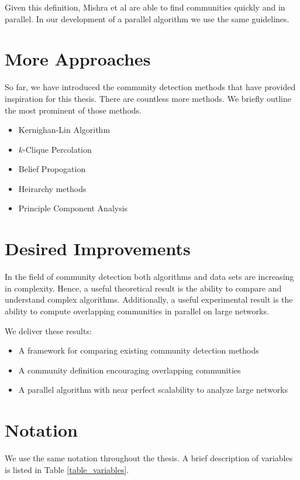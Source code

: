 \documentclass[phd,tocprelim]{cornell}
\begin{document}
Given this definition, Mishra et al\cite{mishra} are able to find communities quickly and in parallel.  In our development of a parallel algorithm we use the same guidelines.

\section {More Approaches}

So far, we have introduced the community detection methods that have provided inspiration for this thesis.  There are countless more methods.  We briefly outline the most prominent of those methods.

\begin{itemize}
\item Kernighan-Lin Algorithm
\item $k$-Clique Percolation
\item Belief Propogation
\item Heirarchy methods
\item Principle Component Analysis
\end{itemize}


\section {Desired Improvements}

In the field of community detection both algorithms and data sets are increasing in complexity.  Hence, a useful theoretical result is the ability to compare and understand complex algorithms.  Additionally, a useful experimental result is the ability to compute overlapping communities in parallel on large networks.

We deliver these results:
\begin{itemize}
\item A framework for comparing existing community detection methods
\item A community definition encouraging overlapping communities
\item A parallel algorithm with near perfect scalability to analyze large networks
\end{itemize}


\section{Notation}

We use the same notation throughout the thesis. A brief description of variables is listed in Table \ref{table_variables}. 
\end{document}
